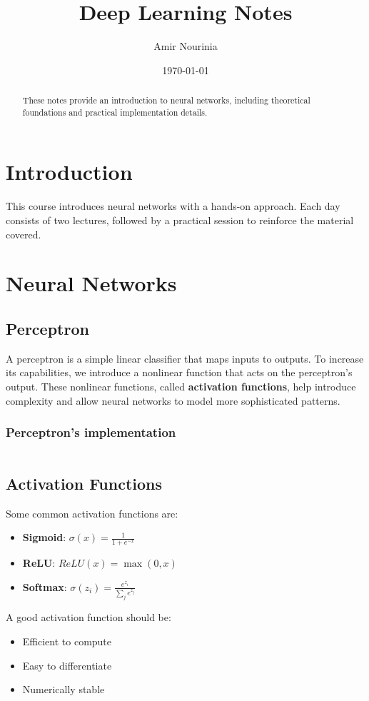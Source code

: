 \documentclass[a4paper,12pt]{article}
\title{\textbf{Deep Learning Notes}}
\author{Amir Nourinia}
\date{\today}
\begin{document}
\maketitle

\begin{abstract}
  These notes provide an introduction to neural networks, including theoretical foundations and practical implementation details.
\end{abstract}

\tableofcontents
\newpage

\section{Introduction}
This course introduces neural networks with a hands-on approach. Each day consists of two lectures,
followed by a practical session to reinforce the material covered.

\section{Neural Networks}

\subsection{Perceptron}
A perceptron is a simple linear classifier that maps inputs to outputs.
To increase its capabilities, we introduce a nonlinear function that acts on the perceptron's output.
These nonlinear functions, called \textbf{activation functions}, help introduce complexity and allow neural
networks to model more sophisticated patterns.
\subsubsection{Perceptron's implementation}
\inputminted[frame=lines, fontsize=\tiny, linenos]{python}{../../blue/layers/dense_layer.py}

\subsection{Activation Functions}
Some common activation functions are:
\begin{itemize}
  \item \textbf{Sigmoid}: $\sigma(x) = \frac{1}{1+e^{-x}}$
  \item \textbf{ReLU}: $ReLU(x) = \max(0, x)$
  \item \textbf{Softmax}: $\sigma(z_i) = \frac{e^{z_i}}{\sum_{j} e^{z_j}}$
\end{itemize}
A good activation function should be:
\begin{itemize}
  \item Efficient to compute
  \item Easy to differentiate
  \item Numerically stable
\end{itemize}
\end{document}
